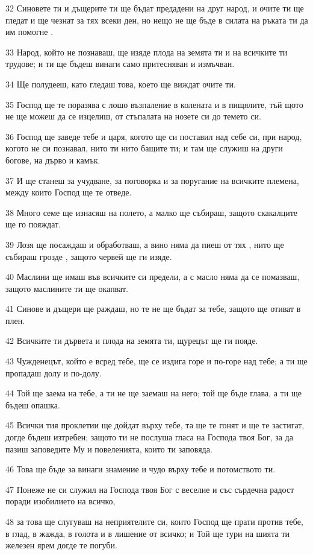 \par 32 Синовете ти и дъщерите ти ще бъдат предадени на друг народ, и очите ти ще гледат и ще чезнат за тях всеки ден, но нещо не ще бъде в силата на ръката ти да им помогне .
\par 33 Народ, който не познаваш, ще изяде плода на земята ти и на всичките ти трудове; и ти ще бъдеш винаги само притесняван и измъчван.
\par 34 Ще полудееш, като гледаш това, което ще виждат очите ти.
\par 35 Господ ще те поразява с лошо възпаление в колената и в пищялите, тъй щото не ще можеш да се изцелиш, от стъпалата на нозете си до темето си.
\par 36 Господ ще заведе тебе и царя, когото ще си поставил над себе си, при народ, когото не си познавал, нито ти нито бащите ти; и там ще служиш на други богове, на дърво и камък.
\par 37 И ще станеш за учудване, за поговорка и за поругание на всичките племена, между които Господ ще те отведе.
\par 38 Много семе ще изнасяш на полето, а малко ще събираш, защото скакалците ще го пояждат.
\par 39 Лозя ще посаждаш и обработваш, а вино няма да пиеш от тях , нито ще събираш грозде , защото червей ще ги изяде.
\par 40 Маслини ще имаш във всичките си предели, а с масло няма да се помазваш, защото маслините ти ще окапват.
\par 41 Синове и дъщери ще раждаш, но те не ще бъдат за тебе, защото ще отиват в плен.
\par 42 Всичките ти дървета и плода на земята ти, щурецът ще ги пояде.
\par 43 Чужденецът, който е всред тебе, ще се издига горе и по-горе над тебе; а ти ще пропадаш долу и по-долу.
\par 44 Той ще заема на тебе, а ти не ще заемаш на него; той ще бъде глава, а ти ще бъдеш опашка.
\par 45 Всички тия проклетии ще дойдат върху тебе, та ще те гонят и ще те застигат, догде бъдеш изтребен; защото ти не послуша гласа на Господа твоя Бог, за да пазиш заповедите Му и повеленията, които ти заповяда.
\par 46 Това ще бъде за винаги знамение и чудо върху тебе и потомството ти.
\par 47 Понеже не си служил на Господа твоя Бог с веселие и със сърдечна радост поради изобилието на всичко,
\par 48 за това ще слугуваш на неприятелите си, които Господ ще прати против тебе, в глад, в жажда, в голота и в лишение от всичко; и Той ще тури на шията ти железен ярем догде те погуби.
